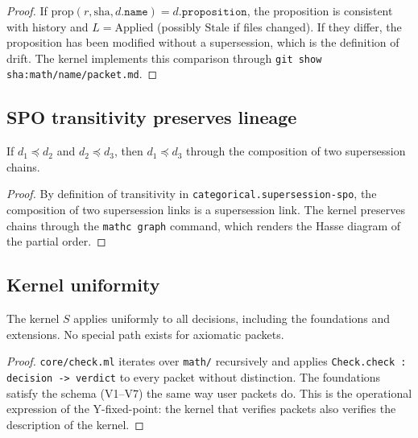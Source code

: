 \begin{proof}
If $\mathrm{prop}(r, \text{sha}, d.\mathtt{name}) = d.\mathtt{proposition}$,
the proposition is consistent with history and $L = \mathrm{Applied}$
(possibly $\mathrm{Stale}$ if files changed). If they differ, the
proposition has been modified without a supersession, which is the
definition of drift. The kernel implements this comparison through
\texttt{git show sha:math/name/packet.md}.
\end{proof}

\subsection{SPO transitivity preserves lineage}

\begin{theorem}
If $d_1 \preceq d_2$ and $d_2 \preceq d_3$, then $d_1 \preceq d_3$
through the composition of two supersession chains.
\end{theorem}

\begin{proof}
By definition of transitivity in
\texttt{categorical.supersession-spo}, the composition of two
supersession links is a supersession link. The kernel preserves
chains through the \texttt{mathc graph} command, which renders the
Hasse diagram of the partial order.
\end{proof}

\subsection{Kernel uniformity}

\begin{theorem}
The kernel $S$ applies uniformly to all decisions, including the
foundations and extensions. No special path exists for axiomatic
packets.
\end{theorem}

\begin{proof}
\texttt{core/check.ml} iterates over \texttt{math/} recursively and
applies \texttt{Check.check : decision -> verdict} to every packet
without distinction. The foundations satisfy the schema (V1--V7)
the same way user packets do. This is the operational expression of
the Y-fixed-point: the kernel that verifies packets also verifies
the description of the kernel.
\end{proof}